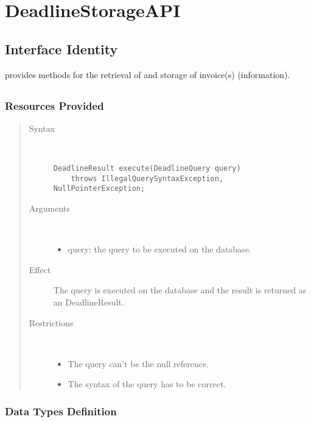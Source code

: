 \section{DeadlineStorageAPI}
\label{api:deadline-storage-api}

\subsection{Interface Identity}

\npar {} provides methods for the retrieval of and
storage of invoice(s) (information).

\subsection{}

\subsubsection{Resources Provided}

\begin{quote}
	\begin{description}
		\item[Syntax] \
		\begin{verbatim}
DeadlineResult execute(DeadlineQuery query)
    throws IllegalQuerySyntaxException, NullPointerException;
		\end{verbatim}
		\item[Arguments] \
		\begin{itemize}
		  \item query: the query to be executed on the database. 
		\end{itemize}
		\item[Effect] The query is executed on the database and the result is returned
		as an DeadlineResult. 
		\item[Restrictions] \
		\begin{itemize}
		  \item The query can't be the null reference.
		  \item The syntax of the query has to be correct.
		\end{itemize}
	\end{description} 
\end{quote}

\subsubsection{Data Types Definition}

